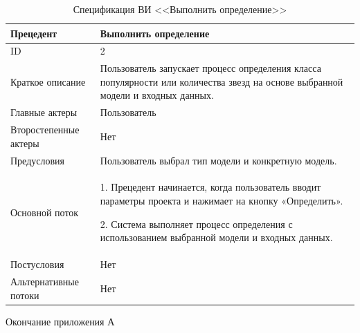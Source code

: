 \begin{table}[H]
    \caption{Спецификация ВИ <<Выполнить определение>>}
    \fontsize{12pt}{1em}\selectfont
    \vspace{1em}
    \begin{tabularx}{\linewidth}{|l|X|}
       \hline
        Прецедент & Выполнить определение\\ \hline
        ID & 2\\ \hline
        Краткое описание & Пользователь запускает процесс определения класса популярности или количества звезд на основе выбранной модели и входных данных.\\ \hline
        Главные актеры & Пользователь\\ \hline
        Второстепенные актеры & Нет \\ \hline
        Предусловия & Пользователь выбрал тип модели и конкретную модель.\\ \hline
        Основной поток &  
        1. Прецедент начинается, когда пользователь вводит параметры проекта и нажимает на кнопку «Определить».
        
        2. Система выполняет процесс определения с использованием выбранной модели и входных данных. \\
        \hline
        Постусловия & Нет \\ \hline
        Альтернативные потоки & Нет \\ \hline
        \end{tabularx} 
    \label{tab:определение  }
\end{table}
\vspace{2em}

\newpage
\begin{flushright}
Окончание приложения А 
\end{flushright}
\vspace{-1.5em}


